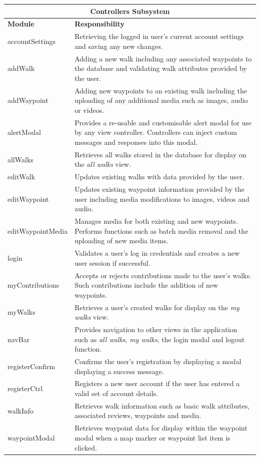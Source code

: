 \documentclass[11pt,a4paper]{report}
\begin{document}
\begin{center}
\begin{tabular}{|l|p{10cm}|}
\hline \multicolumn{2}{|c|}{\textbf{Controllers Subsystem}} \\
\hline \textbf{Module} & \textbf{Responsibility} \\ 
\hline accountSettings & Retrieving the logged in user's current account settings and saving any new changes. \\
\hline addWalk & Adding a new walk including any associated waypoints to the database and validating walk attributes provided by the user. \\
\hline addWaypoint & Adding new waypoints to an existing walk including the uploading of any additional media such as images, audio or videos. \\
\hline alertModal & Provides a re-usable and customisable alert modal for use by any view controller. Controllers can inject custom messages and responses into this modal.\\
\hline allWalks & Retrieves all walks stored in the database for display on the \emph{all walks} view. \\
\hline editWalk & Updates existing walks with data provided by the user. \\
\hline editWaypoint & Updates existing waypoint information provided by the user including media modifications to images, videos and audio. \\
\hline editWaypointMedia & Manages media for both existing and new waypoints. Performs functions such as batch media removal and the uploading of new media items. \\
\hline login & Validates a user's log in credentials and creates a new user session if successful. \\
\hline myContributions & Accepts or rejects contributions made to the user's walks. Such contributions include the addition of new waypoints. \\
\hline myWalks & Retrieves a user's created walks for display on the \emph{my walks} view. \\
\hline navBar & Provides navigation to other views in the application such as \emph{all walks}, \emph{my walks}, the login modal and logout function. \\
\hline registerConfirm & Confirms the user's registration by displaying a modal displaying a success message. \\
\hline registerCtrl & Registers a new user account if the user has entered a valid set of account details. \\
\hline walkInfo & Retrieves walk information such as basic walk attributes, associated reviews, waypoints and media. \\
\hline waypointModal & Retrieves waypoint data for display within the waypoint modal when a map marker or waypoint list item is clicked. \\

\hline
\end{tabular} 
\end{center}
\end{document}
